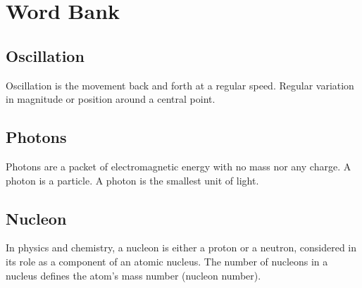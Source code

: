 \documentclass{article}
\begin{document}
\section{Word Bank}
\subsection{Oscillation}\label{sec:oscillation}
Oscillation is the movement back and forth at a regular speed. Regular variation in magnitude or position around a central point.

\subsection{Photons}\label{sec:photons}
Photons are a packet of electromagnetic energy with no mass nor any charge. A photon is a particle. A photon is the smallest unit of light.

\subsection{Nucleon}\label{sec:nucleon}
In physics and chemistry, a nucleon is either a proton or a neutron, considered in its role as a component of an atomic nucleus. The number of nucleons in a nucleus defines the atom's mass number (nucleon number).
\end{document}
